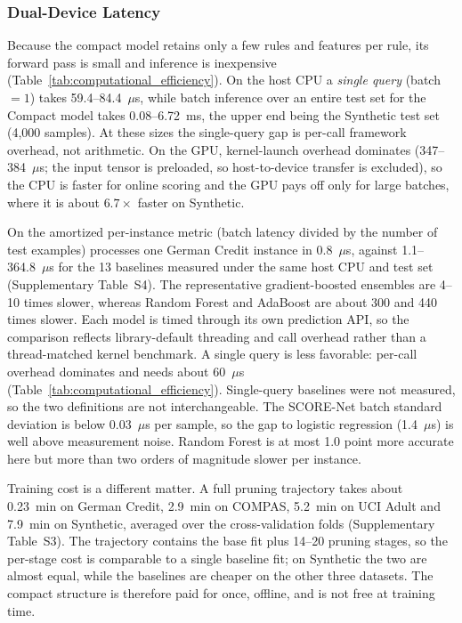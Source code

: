 \subsubsection{Dual-Device Latency}
Because the compact model retains only a few rules and features per rule, its
forward pass is small and inference is inexpensive
(Table~\ref{tab:computational_efficiency}). On the host CPU a \emph{single
query} (batch $=1$) takes 59.4--84.4~$\mu$s, while batch inference over an entire
test set for the Compact model takes 0.08--6.72~ms, the upper end being the
Synthetic test set (4{,}000 samples). At these sizes the single-query gap is
per-call framework overhead, not arithmetic. On the GPU, kernel-launch overhead
dominates (347--384~$\mu$s; the input tensor is preloaded, so host-to-device
transfer is excluded), so the CPU is faster for online scoring and the GPU pays
off only for large batches, where it is about $6.7\times$ faster on Synthetic.

On the amortized per-instance metric (batch latency divided by the number of test
examples) \modelname{} processes one German Credit instance in 0.8~$\mu$s,
against 1.1--364.8~$\mu$s for the 13 baselines measured under the same host CPU
and test set (Supplementary Table~S4). The representative gradient-boosted
ensembles are 4--10 times slower, whereas Random Forest and AdaBoost are about
300 and 440 times slower. Each model is timed through its own prediction API, so
the comparison reflects library-default threading and call overhead rather than a
thread-matched kernel benchmark. A single query is less favorable: per-call
overhead dominates and \modelname{} needs about 60~$\mu$s
(Table~\ref{tab:computational_efficiency}). Single-query baselines were not
measured, so the two definitions are not interchangeable. The SCORE-Net batch
standard deviation is below 0.03~$\mu$s per sample, so the gap to logistic
regression (1.4~$\mu$s) is well above measurement noise. Random Forest is at most
1.0 point more accurate here but more than two orders of magnitude slower per
instance.

Training cost is a different matter. A full pruning trajectory takes about
0.23~min on German Credit, 2.9~min on COMPAS, 5.2~min on UCI Adult and 7.9~min on
Synthetic, averaged over the cross-validation folds (Supplementary Table~S3).
The trajectory contains the base fit plus 14--20 pruning stages, so the per-stage
cost is comparable to a single baseline fit; on Synthetic the two are almost
equal, while the baselines are cheaper on the other three datasets. The compact
structure is therefore paid for once, offline, and is not free at training time.

